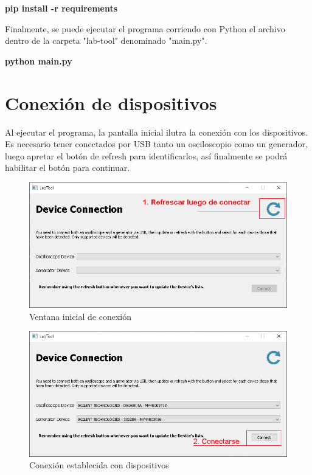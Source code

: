 \begin{center}
    \textbf{pip install -r requirements}
\end{center}

Finalmente, se puede ejecutar el programa corriendo con Python el archivo dentro de la carpeta "lab-tool" denominado "main.py".

\begin{center}
    \textbf{python main.py}
\end{center}

\section{Conexi\'on de dispositivos}
Al ejecutar el programa, la pantalla inicial ilutra la conexi\'on con los dispositivos. Es necesario tener conectados por USB
tanto un osciloscopio como un generador, luego apretar el bot\'on de refresh para identificarlos, as\'i finalmente se podr\'a habilitar
el bot\'on para continuar.

\begin{figure}[H]
    \centering
        \includegraphics[scale=0.75]{../screenshots/primer_paso.png}
    \caption{Ventana inicial de conexi\'on}
\end{figure}

\begin{figure}[H]
    \centering
        \includegraphics[scale=0.75]{../screenshots/conexion_establecido.PNG}
    \caption{Conexi\'on establecida con dispositivos}
\end{figure}

